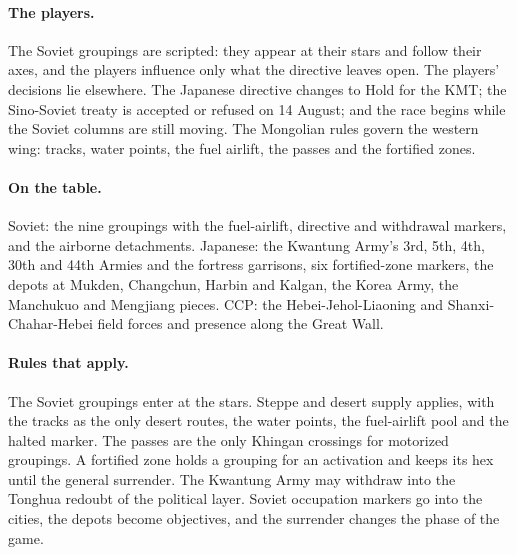 \documentclass[11pt]{article}
\begin{document}
\paragraph{The players.} The Soviet groupings are scripted: they appear at their stars and follow their axes, and the players influence only what the directive leaves open. The players' decisions lie elsewhere. The Japanese directive changes to Hold for the KMT; the Sino-Soviet treaty is accepted or refused on 14 August; and the race begins while the Soviet columns are still moving. The Mongolian rules govern the western wing: tracks, water points, the fuel airlift, the passes and the fortified zones.
\paragraph{On the table.} Soviet: the nine groupings with the fuel-airlift, directive and withdrawal markers, and the airborne detachments. Japanese: the Kwantung Army's 3rd, 5th, 4th, 30th and 44th Armies and the fortress garrisons, six fortified-zone markers, the depots at Mukden, Changchun, Harbin and Kalgan, the Korea Army, the Manchukuo and Mengjiang pieces. CCP: the Hebei-Jehol-Liaoning and Shanxi-Chahar-Hebei field forces and presence along the Great Wall.
\paragraph{Rules that apply.} The Soviet groupings enter at the stars. Steppe and desert supply applies, with the tracks as the only desert routes, the water points, the fuel-airlift pool and the halted marker. The passes are the only Khingan crossings for motorized groupings. A fortified zone holds a grouping for an activation and keeps its hex until the general surrender. The Kwantung Army may withdraw into the Tonghua redoubt of the political layer. Soviet occupation markers go into the cities, the depots become objectives, and the surrender changes the phase of the game.
\clearpage
\end{document}
